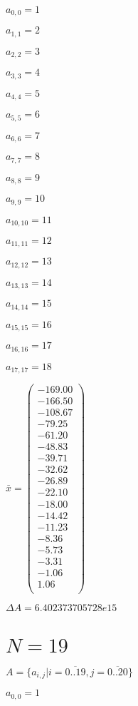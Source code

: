 \documentclass[a4paper,12pt]{article}
\begin{document}
$a _{ 0, 0 } = 1$

$a _{ 1, 1 } = 2$

$a _{ 2, 2 } = 3$

$a _{ 3, 3 } = 4$

$a _{ 4, 4 } = 5$

$a _{ 5, 5 } = 6$

$a _{ 6, 6 } = 7$

$a _{ 7, 7 } = 8$

$a _{ 8, 8 } = 9$

$a _{ 9, 9 } = 10$

$a _{ 10, 10 } = 11$

$a _{ 11, 11 } = 12$

$a _{ 12, 12 } = 13$

$a _{ 13, 13 } = 14$

$a _{ 14, 14 } = 15$

$a _{ 15, 15 } = 16$

$a _{ 16, 16 } = 17$

$a _{ 17, 17 } = 18$

$\bar { x } = \begin{pmatrix}
-169.00 \\
-166.50 \\
-108.67 \\
-79.25 \\
-61.20 \\
-48.83 \\
-39.71 \\
-32.62 \\
-26.89 \\
-22.10 \\
-18.00 \\
-14.42 \\
-11.23 \\
-8.36 \\
-5.73 \\
-3.31 \\
-1.06 \\
1.06 \\
\end{pmatrix}
$

$\Delta A = 6.402373705728e15$



\section{ $N = 19$ }
$A = \{ a _{ i, j } | i = \overline { 0..19 }, j = \overline { 0..20 } \}$

$a _{ 0, 0 } = 1$
\end{document}
